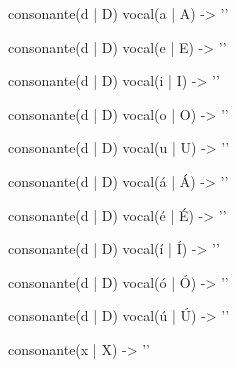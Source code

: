 \documentclass{minimal}
\begin{document}
    consonante(d | D) vocal(a | A) -> '\Tando\Tvilya'
    
    consonante(d | D) vocal(e | E) -> '\Tando\Tyanta'
    
    consonante(d | D) vocal(i | I) -> '\Tando\Ttelco'
    
    consonante(d | D) vocal(o | O) -> '\Tando\Tanna'
    
    consonante(d | D) vocal(u | U) -> '\Tando\Tvala'
    
    consonante(d | D) vocal(á | Á) -> '\Tando\Tvilya\TTdoubler'
    
    consonante(d | D) vocal(é | É) -> '\Tando\Tyanta\TTdoubler'
    
    consonante(d | D) vocal(í | Í) -> '\Tando\Ttelco\TTdoubler'
    
    consonante(d | D) vocal(ó | Ó) -> '\Tando\Tanna\TTdoubler'
    
    consonante(d | D) vocal(ú | Ú) -> '\Tando\Tvala\TTdoubler'
    
    
    consonante(x | X) -> '\Tquesse\Tlefthook'
    
    
\end{document}

